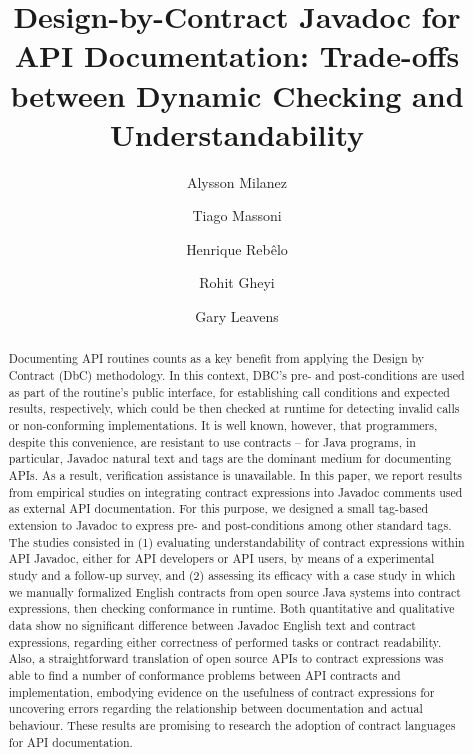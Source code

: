\documentclass[a4paper,UKenglish]{lipics-v2018}
\title{Design-by-Contract Javadoc for API Documentation: Trade-offs between Dynamic Checking and Understandability}
\author{Alysson Milanez}{Department of Systems and Computing, UFCG, Brazil}{alyssonfilgueira@copin.ufcg.edu.br}{}{}
\author{Tiago Massoni}{Department of Systems and Computing, UFCG, Brazil}{massoni@dsc.ufcg.edu.br}{}{}
\author{Henrique Reb\^{e}lo}{Informatics Center, UFPE, Brazil}{hemr@cin.ufpe.br}{}{}
\author{Rohit Gheyi}{Department of Systems and Computing, UFCG, Brazil}{rohit@dsc.ufcg.edu.br}{}{}
\author{Gary Leavens}{Department of Computer Science, UCF, USA}{leavens@cs.ucf.edu}{}{}
\newcommand{\contractjdoc}[1]{\textsc{ContractJDoc}}
\begin{document}
\maketitle

\begin{abstract}
Documenting API routines counts as a key benefit from applying the Design by Contract (DbC) methodology. 
In this context, DBC's pre- and post-conditions are used as part of the routine's public interface, for establishing call conditions and expected results, respectively, which could be then checked at runtime for detecting invalid calls or non-conforming implementations.
%
It is well known, however, that programmers, despite this convenience, are resistant to use contracts -- for Java programs, in particular, Javadoc natural text and tags are the dominant medium for documenting APIs. 
As a result, verification assistance is unavailable.
%
In this paper, we report results from empirical studies on integrating contract expressions into Javadoc comments used as external API documentation. 
For this purpose, we designed a small tag-based extension to Javadoc to express pre- and post-conditions among other standard tags.
%
The studies consisted in (1) evaluating understandability of contract expressions within API Javadoc, either for API developers or API users, by means of a experimental study and a follow-up survey, and (2) assessing its efficacy with a case study in which we manually formalized English contracts from open source Java systems into contract expressions, then checking conformance in runtime.    
%
Both quantitative and qualitative data show no significant difference between Javadoc English text and contract expressions, regarding either correctness of performed tasks or contract readability. 
Also, a straightforward translation of open source APIs to contract expressions was able to find a number of conformance problems between API contracts and implementation, embodying evidence on the usefulness of contract expressions for uncovering errors regarding the relationship between documentation and actual behaviour.
%
These results are promising to research the adoption of contract languages for API documentation.
\end{abstract}













\end{document}
